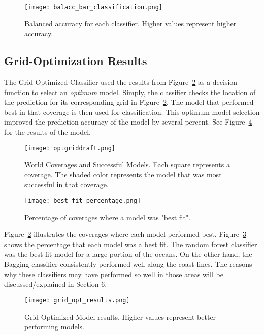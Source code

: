\begin{figure}[htp]
    \centering
    \texttt{[image: balacc\_bar\_classification.png]}
    \caption[Graph depicting Balanced Accuracy for each classifier]{Balanced accuracy for each classifier. Higher values represent higher accuracy.}
    \label{fig:balacc_barplot_classification}
\end{figure}

\subsection{Grid-Optimization Results}
The Grid Optimized Classifier used the results from Figure~\ref{fig:coveragegrid} as a decision function to select an \textit{optimum} model.
Simply, the classifier checks the location of the prediction for its corresponding grid in Figure~\ref{fig:coveragegrid}.
The model that performed best in that coverage is then used for classification.
This optimum model selection improved the prediction accuracy of the model by several percent.
See Figure~\ref{fig:grid_opt_barplot} for the results of the model.



\newpage

\begin{figure}[htp]
    \centering
    \texttt{[image: optgriddraft.png]}
    \caption[Figure depicting the successful model cache]{World Coverages and Successful Models.
    Each square represents a coverage.
    The shaded color represents the model that was most successful in that coverage.}
    \label{fig:coveragegrid}
\end{figure}


\newpage
\begin{figure}[htp]
    \centering
    \texttt{[image: best\_fit\_percentage.png]}
    \caption[Graph depicting the percentage of predictions each model will perform]{Percentage of coverages where a model was "best fit".}
    \label{fig:pie_best_fit}
\end{figure}

\par
Figure~\ref{fig:coveragegrid} illustrates the coverages where each model performed best.
Figure~\ref{fig:pie_best_fit} shows the percentage that each model was a best fit.
The random forest classifier was the best fit model for a large portion of the oceans.
On the other hand, the Bagging classifier consistently performed well along the coast lines.
The reasons why these classifiers may have performed so well in those areas will be discussed/explained in Section 6.

\newpage
\begin{figure}[htp]
    \centering
    \texttt{[image: grid\_opt\_results.png]}
    \caption[Graph depicting metrics using the Grid Selection Optimization]{Grid Optimized Model results. Higher values represent better performing models.}
    \label{fig:grid_opt_barplot}
\end{figure}

